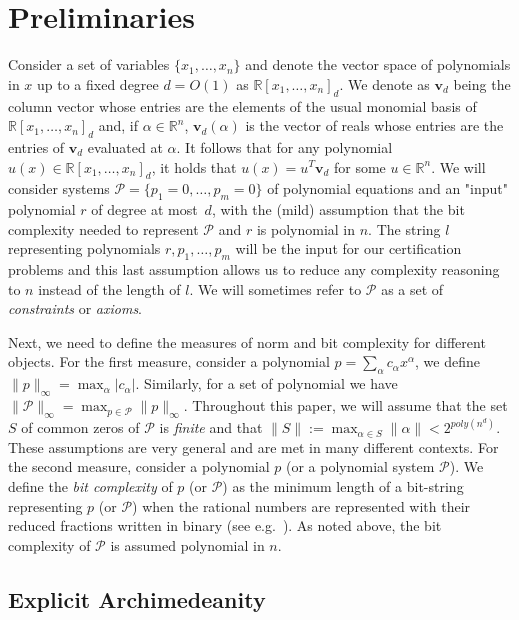 \documentclass[11pt]{article}
\newcommand{\1}{\textbf{1}}
\begin{document}
\section{Preliminaries}\label{sect:prelim}
Consider a set of variables $\{x_1,\ldots,x_n\}$ and denote the vector space of polynomials in $x$ up to a fixed degree $d = O(1)$ as $\mathbb{R}[x_1, \dots, x_n]_d$. We denote as $\mathbf{v}_d$ being the column vector whose entries are the elements of the usual monomial basis of $\mathbb{R}[x_1, \dots, x_n]_d$ and, if $\alpha \in \mathbb{R}^n$, $\mathbf{v}_d(\alpha)$ is the vector of reals whose entries are the entries of $\mathbf{v}_d$ evaluated at $\alpha$. It follows that for any polynomial $u(x) \in \mathbb{R}[x_1, \dots, x_n]_d$, it holds that $u(x) = u^{T} \mathbf{v}_d$ for some $u \in \mathbb{R}^n$. 
We will consider systems $\mathcal{P} = \{p_1 = 0,\ldots,p_m = 0\}$ of polynomial equations and an "input" polynomial $r$ of degree at most~$d$, with the (mild) assumption that the bit complexity needed to represent $\mathcal{P}$ and $r$ is polynomial in $n$. The string $l$ representing polynomials $r, p_1, \dots, p_m$ will be the input for our certification problems and this last assumption allows us to reduce any complexity reasoning to $n$ instead of the length of $l$. We will sometimes refer to $\mathcal{P}$ as a set of \emph{constraints} or \emph{axioms}.

Next, we need to define the measures of norm and bit complexity for different objects. For the first measure, consider a polynomial $p = \sum_\alpha c_\alpha x^\alpha$, we define $\| p \|_{\infty} = \max_\alpha |c_{\alpha}|$. Similarly, for a set of polynomial we have $\| \mathcal{P} \|_{\infty} = \max_{p \in \mathcal{P}} \| p \|_{\infty}$. Throughout this paper, we will assume that the set $S$ of common zeros of $\mathcal P$ is \textit{finite} and that  $\| S \| := \max_{\alpha \in S} \| \alpha \| < 2^{poly(n^d)}$. These assumptions are very general and are met in many different contexts. For the second measure, consider a polynomial $p$ (or a polynomial system $\mathcal{P}$). We define the \emph{bit complexity} of $p$ (or $\mathcal{P}$) as the minimum length of a bit-string representing $p$ (or $\mathcal{P}$) when the rational numbers are represented with their reduced fractions written in binary (see e.g.~\cite{Hakoniemi21}). As noted above, the bit complexity of $\mathcal{P}$ is assumed polynomial in $n$.

\subsection*{Explicit Archimedeanity}
\end{document}
